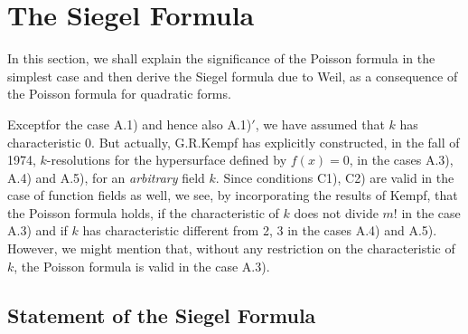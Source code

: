 \section{The Siegel Formula}\label{chap4:sec3} %

In this section, we shall explain the significance of the Poisson
formula in the simplest case and then derive the Siegel formula due to
Weil, as a consequence of the Poisson formula for quadratic forms.

\begin{Remark*}
  Except\pageoriginale for the case A.1) and hence also A.1)$'$, we have
  assumed that $k$ has characteristic $0$. But actually, G.R.\@ Kempf
  has explicitly constructed, in the fall of 1974, $k$-resolutions for
  the hypersurface defined by $f(x)=0$, in the cases A.3), A.4) and
  A.5), for an {\em arbitrary} field $k$. Since conditions C1), C2) are
  valid in the case of function fields as well, we see, by incorporating
  the results of Kempf, that the Poisson formula holds, if the
  characteristic of $k$ does not divide $m!$ in the case A.3) and if $k$
  has characteristic different from 2, 3 in the cases A.4) and
  A.5). However, we might mention that, without any restriction on the
  characteristic of $k$, the Poisson formula is valid in the case A.3).
\end{Remark*}

\subsection{Statement of the Siegel Formula}\label{chap4:sec3:subsec1} %

